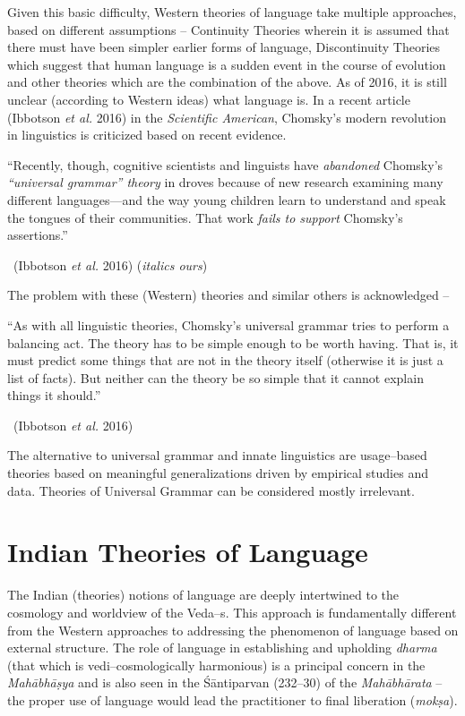 Given this basic difficulty, Western theories of language take multiple approaches, based on different assumptions – Continuity Theories wherein it is assumed that there must have been simpler earlier forms of language, Discontinuity Theories which suggest that human language is a sudden event in the course of evolution and other theories which are the combination of the above. As of 2016, it is still unclear (according to Western ideas) what language is. In a recent article (Ibbotson \textit{et al.} 2016) in the \textit{Scientific American}, Chomsky’s modern revolution in linguistics is criticized based on recent evidence.

\begin{myquote}
“Recently, though, cognitive scientists and linguists have \textit{abandoned} Chomsky’s \textit{“universal grammar” theory} in droves because of new research examining many different languages—and the way young children learn to understand and speak the tongues of their communities. That work \textit{fails to support} Chomsky’s assertions.” 

~\hfill (Ibbotson \textit{et al.} 2016) (\textit{italics ours})
\end{myquote}

The problem with these (Western) theories and similar others is acknowledged –

\begin{myquote}
“As with all linguistic theories, Chomsky’s universal grammar tries to perform a balancing act. The theory has to be simple enough to be worth having. That is, it must predict some things that are not in the theory itself (otherwise it is just a list of facts). But neither can the theory be so simple that it cannot explain things it should.” 

~\hfill (Ibbotson \textit{et al.} 2016)
\end{myquote}

The alternative to universal grammar and innate linguistics are usage–based theories based on meaningful generalizations driven by empirical studies and data. Theories of Universal Grammar can be considered mostly irrelevant.


\section*{Indian Theories of Language}

The Indian (theories) notions of language are deeply intertwined to the cosmology and worldview of the Veda–s. This approach is fundamentally different from the Western approaches to addressing the phenomenon of language based on external structure. The role of language in establishing and upholding \textit{dharma} (that which is vedi–cosmologically harmonious) is a principal concern in the \textit{Mahābhāṣya} and is also seen in the Śāntiparvan (232–30) of the \textit{Mahābhārata} – the proper use of language would lead the practitioner to final liberation (\textit{mokṣa}).


